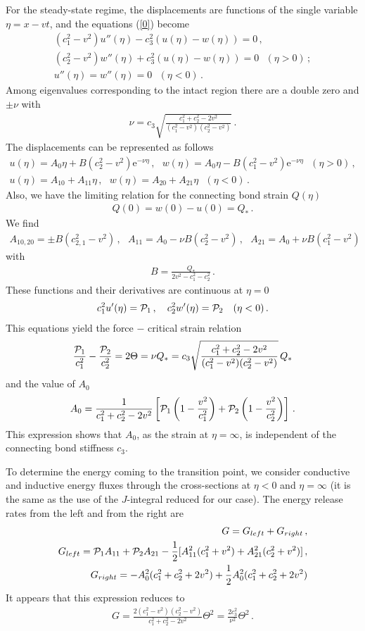 \documentclass[12pt]{article}
\newcommand{\f}{\frac}
\newcommand{\n}{\nonumber \\}
\newcommand{\beq}{\begin{eqnarray}}
\newcommand{\eeq}[1]{\label{#1}\end{eqnarray}}
\newcommand\eq[1]{(\ref{#1})}
\newcommand\gl{\left}
\newcommand\gr{\right}
\newcommand{\CP}{{\cal P}}
\newcommand{\Gn}{\eta}
\newcommand{\GT}{\Theta}
\newcommand\E{\mathrm{e}}
\begin{document}
For the steady-state regime, the displacements are functions of the single variable $\Gn=x-vt$, and the equations \eq{0} become
\beq (c_1^2-v^2)u''(\Gn) - c_3^2(u(\Gn)-w(\Gn))=0\,,\n
(c_2^2-v^2)w''(\Gn) +c_3^2(u(\Gn)-w(\Gn))=0~~~(\Gn>0)\,;\n
u''(\Gn) = w''(\Gn) =0~~~(\Gn<0)\,.\eeq{cm2}
Among eigenvalues corresponding to the intact region there are a double zero and $\pm \nu$ with
\beq \nu = c_3\sqrt{\f{c_1^2+c_2^2-2v^2}{(c_1^2-v^2)(c_2^2-v^2)}}\,.\eeq{cm3}
The displacements can be represented as follows
\beq u(\Gn) =A_0\Gn  + B(c_2^2-v^2)\E^{-\nu\Gn} \,,~~~w(\Gn)= A_0\Gn - B(c_1^2-v^2)\E^{-\nu\Gn}~~~(\Gn>0)\,,\n
u(\Gn) = A_{10} + A_{11}\Gn\,,~~~w(\Gn) = A_{20} + A_{21}\Gn~~~(\Gn<0)\,.\eeq{cm4}
Also, we have the limiting relation for the connecting bond strain $Q(\Gn)$
\beq Q(0) = w(0)-u(0) = Q_*\,.\eeq{lsc1}
We find
\beq A_{10,20} = \pm B(c_{2,1}^2-v^2)\,,~~~A_{11} = A_0- \nu B(c_2^2-v^2)\,,~~~A_{21} = A_0+\nu B(c_1^2-v^2)\eeq{fcr1}
with
\beq B =  \f{Q_*}{2v^2 -c_1^2-c_2^2}\,.\eeq{fcr2}
These functions and their derivatives are continuous at $\Gn=0$
\beq c_1^2u'(\Gn) = \CP_1\,,~~~c_2^2w'(\Gn) = \CP_2~~~(\Gn<0)\,.\eeq{fcr3}
This equations yield the force $-$ critical strain relation
\beq \f{\CP_1}{c_1^2}-\f{\CP_2}{c_2^2} =2\GT=\nu Q_* = c_3\sqrt{\f{c_1^2+c_2^2-2v^2}{(c_1^2-v^2)(c_2^2-v^2)}}\,Q_*\eeq{fcr4}
and the value of $A_0$
\beq A_0= \f{1}{c_1^2+c_2^2-2v^2}\gl[\CP_1\gl(1-\f{v^2}{c_1^2}\gr)+\CP_2\gl(1-\f{v^2}{c_2^2}\gr)\gr]\,.\eeq{fcr5}
This expression shows that $A_0$,  as the strain at $\Gn=\infty$, is independent of the connecting bond stiffness $c_3$.

To determine the energy coming to the transition point, we consider conductive and inductive energy fluxes through the cross-sections at $\Gn<0$ and $\Gn=\infty$ (it is the same as the use of the $J$-integral reduced for our case). The energy release rates from the left and from the right are
\beq G= G_{left} + G_{right}\,,\n
G_{left} = \CP_1A_{11}+\CP_2A_{21} -\f{1}{2}[A_{11}^2(c_1^2+v^2) + A_{21}^2(c_2^2+v^2)]\,,\n
G_{right}= - A_0^2(c_1^2 +c_2^2 +2v^2)+ \f{1}{2}A_0^2(c_1^2 +c_2^2 +2v^2)\eeq{fcr6a}
It appears that this expression reduces to
\beq G= \f{2(c_1^2-v^2)(c_2^2-v^2)}{c_1^2+c_2^2-2v^2} \GT^2=\f{2c_3^2}{\nu^2}\GT^2\,.\eeq{fcr6}
\end{document}
